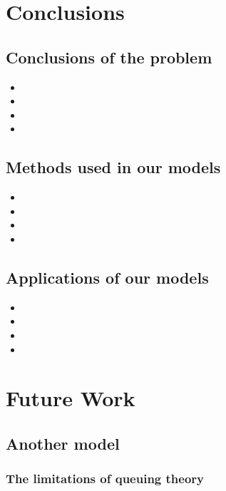 \documentclass{apmcmthesis}
\begin{document}
\section{Conclusions}

\subsection{Conclusions of the problem}
\begin{itemize}
  \item
  \item
  \item
  \item
\end{itemize}
\subsection{Methods used in our models}
\begin{itemize}
  \item
  \item
  \item
  \item
\end{itemize}
\subsection{Applications of our models}
\begin{itemize}
  \item
  \item
  \item
  \item
\end{itemize}
\section{Future Work}
\subsection{Another model}
\subsubsection{The limitations of queuing theory}




\subsubsection{}
\end{document}
